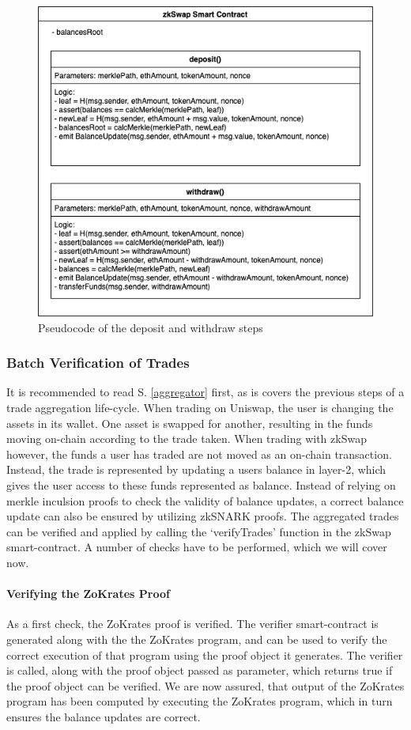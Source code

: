 \documentclass[../../thesis.tex]{subfiles}
\begin{document}
\begin{figure}[h]
    \centerline{\includegraphics[totalheight=8cm]{diagrams/deposit.png}}
    \caption{Pseudocode of the deposit and withdraw steps}
    \label{fig:dep_with}
\end{figure}


\subsubsection{Batch Verification of Trades}
It is recommended to read S. \ref{aggregator} first, as is covers the previous steps of a trade aggregation life-cycle. When trading on Uniswap, the user is changing the assets in its wallet. One asset is swapped for another, resulting in the funds moving on-chain according to the trade taken. When trading with zkSwap however, the funds a user has traded are not moved as an on-chain transaction. Instead, the trade is represented by updating a users balance in layer-2, which gives the user access to these funds represented as balance. Instead of relying on merkle inculsion proofs to check the validity of balance updates, a correct balance update can also be ensured by utilizing zkSNARK proofs. The aggregated trades can be verified and applied by calling the `verifyTrades' function in the zkSwap smart-contract. A number of checks have to be performed, which we will cover now.

\paragraph{Verifying the ZoKrates Proof}
As a first check, the ZoKrates proof is verified. The verifier smart-contract is generated along with the the ZoKrates program, and can be used to verify the correct execution of that program using the proof object it generates. The verifier is called, along with the proof object passed as parameter, which returns true if the proof object can be verified. We are now assured, that output of the ZoKrates program has been computed by executing the ZoKrates program, which in turn ensures the balance updates are correct. 
\end{document}
